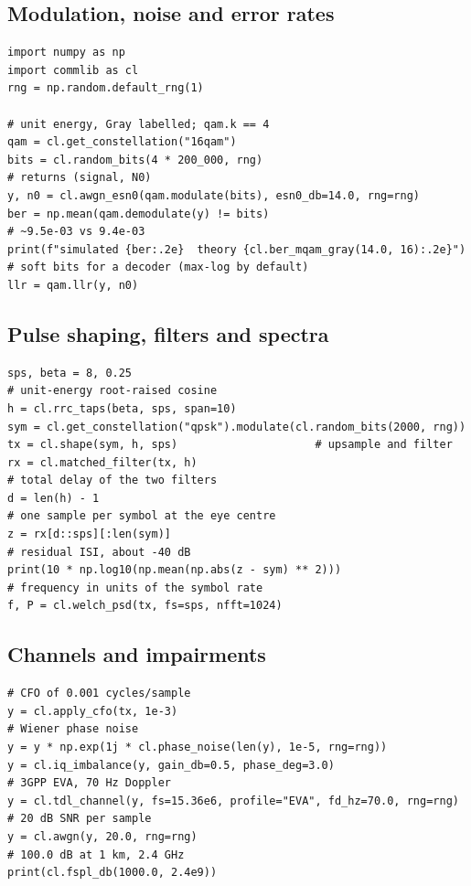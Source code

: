 \subsection{Modulation, noise and error rates}

\begin{lstlisting}
import numpy as np
import commlib as cl
rng = np.random.default_rng(1)

# unit energy, Gray labelled; qam.k == 4
qam = cl.get_constellation("16qam")
bits = cl.random_bits(4 * 200_000, rng)
# returns (signal, N0)
y, n0 = cl.awgn_esn0(qam.modulate(bits), esn0_db=14.0, rng=rng)
ber = np.mean(qam.demodulate(y) != bits)
# ~9.5e-03 vs 9.4e-03
print(f"simulated {ber:.2e}  theory {cl.ber_mqam_gray(14.0, 16):.2e}")
# soft bits for a decoder (max-log by default)
llr = qam.llr(y, n0)
\end{lstlisting}

\subsection{Pulse shaping, filters and spectra}

\begin{lstlisting}
sps, beta = 8, 0.25
# unit-energy root-raised cosine
h = cl.rrc_taps(beta, sps, span=10)
sym = cl.get_constellation("qpsk").modulate(cl.random_bits(2000, rng))
tx = cl.shape(sym, h, sps)                     # upsample and filter
rx = cl.matched_filter(tx, h)
# total delay of the two filters
d = len(h) - 1
# one sample per symbol at the eye centre
z = rx[d::sps][:len(sym)]
# residual ISI, about -40 dB
print(10 * np.log10(np.mean(np.abs(z - sym) ** 2)))
# frequency in units of the symbol rate
f, P = cl.welch_psd(tx, fs=sps, nfft=1024)
\end{lstlisting}


\subsection{Channels and impairments}

\begin{lstlisting}
# CFO of 0.001 cycles/sample
y = cl.apply_cfo(tx, 1e-3)
# Wiener phase noise
y = y * np.exp(1j * cl.phase_noise(len(y), 1e-5, rng=rng))
y = cl.iq_imbalance(y, gain_db=0.5, phase_deg=3.0)
# 3GPP EVA, 70 Hz Doppler
y = cl.tdl_channel(y, fs=15.36e6, profile="EVA", fd_hz=70.0, rng=rng)
# 20 dB SNR per sample
y = cl.awgn(y, 20.0, rng=rng)
# 100.0 dB at 1 km, 2.4 GHz
print(cl.fspl_db(1000.0, 2.4e9))
\end{lstlisting}

